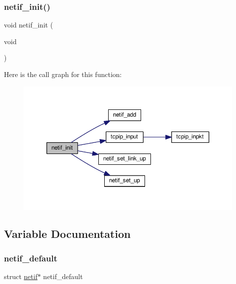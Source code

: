 \subsubsection{\texorpdfstring{netif\+\_\+init()}{netif\_init()}}
{\footnotesize\ttfamily void netif\+\_\+init (\begin{DoxyParamCaption}\item[{void}]{ }\end{DoxyParamCaption})}

Here is the call graph for this function\+:
\nopagebreak
\begin{figure}[H]
\begin{center}
\leavevmode
\includegraphics[width=350pt]{openmote-cc2538_2lwip_2src_2include_2lwip_2netif_8h_a0f4a53e47c840904f824a2a1c0d4ebf4_cgraph}
\end{center}
\end{figure}


\subsection{Variable Documentation}
\mbox{\label{openmote-cc2538_2lwip_2src_2include_2lwip_2netif_8h_a3d0925cbce550ed461907aee816713ba}} 
\subsubsection{\texorpdfstring{netif\+\_\+default}{netif\_default}}
{\footnotesize\ttfamily struct \hyperlink{structnetif}{netif}$\ast$ netif\+\_\+default}

